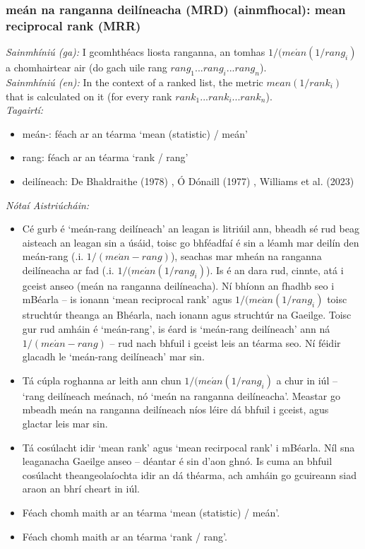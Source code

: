 \subsubsection*{meán na ranganna deilíneacha (MRD) (ainmfhocal): mean reciprocal rank (MRR)}
 \noindent \textit{Sainmhíniú (ga):} I gcomhthéacs liosta ranganna, an tomhas $1 / (me\acute{a}n(1 / rang_i)$ a chomhairtear air (do gach uile rang $rang_1...rang_i...rang_n$).
\\
 \noindent \textit{Sainmhíniú (en):} In the context of a ranked list, the metric $mean(1 / rank_i)$ that is calculated on it (for every rank $rank_1...rank_i...rank_n$).
\\
 \noindent \textit{Tagairtí:}
\begin{itemize}
	\item meán-: féach ar an téarma `mean (statistic) / meán'
	\item rang: féach ar an téarma `rank / rang'
	\item deilíneach: De Bhaldraithe (1978) \cite{de-bhaldraithe}, Ó Dónaill (1977) \cite{odonaill}, Williams et al. (2023) \cite{storchiste}
\end{itemize}

 \noindent \textit{Nótaí Aistriúcháin:}
\begin{itemize}
	\item Cé gurb é `meán-rang deilíneach' an leagan is litriúil ann, bheadh sé rud beag aisteach an leagan sin a úsáid, toisc go bhféadfaí é sin a léamh mar deilín den meán-rang (.i. $1 / (me\acute{a}n-rang)$), seachas mar mheán na ranganna deilíneacha ar fad (.i. $1 / (me\acute{a}n(1 / rang_i)$). Is é an dara rud, cinnte, atá i gceist anseo (meán na ranganna deilíneacha). Ní bhíonn an fhadhb seo i mBéarla -- is ionann `mean reciprocal rank' agus $1 / (me\acute{a}n(1 / rang_i)$ toisc struchtúr theanga an Bhéarla, nach ionann agus struchtúr na Gaeilge. Toisc gur rud amháin é `meán-rang', is éard is `meán-rang deilíneach' ann ná $1 / (me\acute{a}n-rang)$ -- rud nach bhfuil i gceist leis an téarma seo. Ní féidir glacadh le `meán-rang deilíneach' mar sin.
	\item Tá cúpla roghanna ar leith ann chun $1 / (me\acute{a}n(1 / rang_i)$ a chur in iúl -- `rang deilíneach meánach, nó `meán na ranganna deilíneacha'. Meastar go mbeadh meán na ranganna deilíneach níos léire dá bhfuil i gceist, agus glactar leis mar sin.
	\item Tá cosúlacht idir `mean rank' agus `mean recirpocal rank' i mBéarla. Níl sna leaganacha Gaeilge anseo -- déantar é sin d'aon ghnó. Is cuma an bhfuil cosúlacht theangeolaíochta idir an dá théarma, ach amháin go gcuireann siad araon an bhrí cheart in iúl.
	\item Féach chomh maith ar an téarma `mean (statistic) / meán'.
	\item Féach chomh maith ar an téarma `rank / rang'.
\end{itemize}


